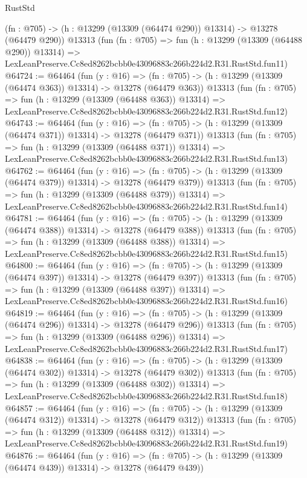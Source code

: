 \begin{lexlean}{RustStd}
\begin{coremodule}
    (fn : @705) -> (h : @13299 (@13309 (@64474 @290)) @13314) -> @13278 (@64479 @290))
    @13313
    (fun (fn : @705) =>
    fun (h : @13299 (@13309 (@64488 @290)) @13314) =>
    LexLeanPreserve.Cc8ed8262bcbb0e43096883c266b224d2.R31.RustStd.fun11)
@64724 := @64464
    (fun (y : @16) =>
    (fn : @705) -> (h : @13299 (@13309 (@64474 @363)) @13314) -> @13278 (@64479 @363))
    @13313
    (fun (fn : @705) =>
    fun (h : @13299 (@13309 (@64488 @363)) @13314) =>
    LexLeanPreserve.Cc8ed8262bcbb0e43096883c266b224d2.R31.RustStd.fun12)
@64743 := @64464
    (fun (y : @16) =>
    (fn : @705) -> (h : @13299 (@13309 (@64474 @371)) @13314) -> @13278 (@64479 @371))
    @13313
    (fun (fn : @705) =>
    fun (h : @13299 (@13309 (@64488 @371)) @13314) =>
    LexLeanPreserve.Cc8ed8262bcbb0e43096883c266b224d2.R31.RustStd.fun13)
@64762 := @64464
    (fun (y : @16) =>
    (fn : @705) -> (h : @13299 (@13309 (@64474 @379)) @13314) -> @13278 (@64479 @379))
    @13313
    (fun (fn : @705) =>
    fun (h : @13299 (@13309 (@64488 @379)) @13314) =>
    LexLeanPreserve.Cc8ed8262bcbb0e43096883c266b224d2.R31.RustStd.fun14)
@64781 := @64464
    (fun (y : @16) =>
    (fn : @705) -> (h : @13299 (@13309 (@64474 @388)) @13314) -> @13278 (@64479 @388))
    @13313
    (fun (fn : @705) =>
    fun (h : @13299 (@13309 (@64488 @388)) @13314) =>
    LexLeanPreserve.Cc8ed8262bcbb0e43096883c266b224d2.R31.RustStd.fun15)
@64800 := @64464
    (fun (y : @16) =>
    (fn : @705) -> (h : @13299 (@13309 (@64474 @397)) @13314) -> @13278 (@64479 @397))
    @13313
    (fun (fn : @705) =>
    fun (h : @13299 (@13309 (@64488 @397)) @13314) =>
    LexLeanPreserve.Cc8ed8262bcbb0e43096883c266b224d2.R31.RustStd.fun16)
@64819 := @64464
    (fun (y : @16) =>
    (fn : @705) -> (h : @13299 (@13309 (@64474 @296)) @13314) -> @13278 (@64479 @296))
    @13313
    (fun (fn : @705) =>
    fun (h : @13299 (@13309 (@64488 @296)) @13314) =>
    LexLeanPreserve.Cc8ed8262bcbb0e43096883c266b224d2.R31.RustStd.fun17)
@64838 := @64464
    (fun (y : @16) =>
    (fn : @705) -> (h : @13299 (@13309 (@64474 @302)) @13314) -> @13278 (@64479 @302))
    @13313
    (fun (fn : @705) =>
    fun (h : @13299 (@13309 (@64488 @302)) @13314) =>
    LexLeanPreserve.Cc8ed8262bcbb0e43096883c266b224d2.R31.RustStd.fun18)
@64857 := @64464
    (fun (y : @16) =>
    (fn : @705) -> (h : @13299 (@13309 (@64474 @312)) @13314) -> @13278 (@64479 @312))
    @13313
    (fun (fn : @705) =>
    fun (h : @13299 (@13309 (@64488 @312)) @13314) =>
    LexLeanPreserve.Cc8ed8262bcbb0e43096883c266b224d2.R31.RustStd.fun19)
@64876 := @64464
    (fun (y : @16) =>
    (fn : @705) -> (h : @13299 (@13309 (@64474 @439)) @13314) -> @13278 (@64479 @439))

\end{coremodule}
\end{lexlean}
